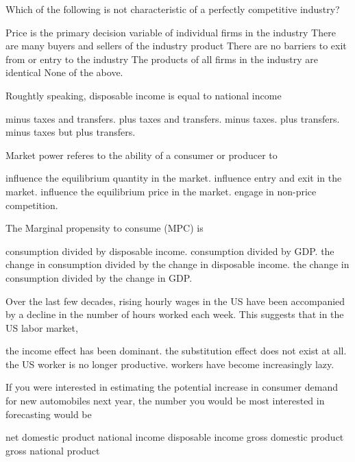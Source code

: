 \begin{questions}
  \question[2] Which of the following is not characteristic of a
  perfectly competitive industry?
  \begin{choices}
    \CorrectChoice Price is the primary decision variable of
    individual firms in the industry
    \choice There are many buyers and sellers of the industry product
    \choice There are no barriers to exit from or entry to the
    industry
    \choice The products of all firms in the industry are identical
    \choice None of the above.
  \end{choices}

  \question[2] Roughtly speaking, disposable income is equal to
  national income
  \begin{choices}
    \choice minus taxes and transfers.
    \choice plus taxes and transfers.
    \choice minus taxes.
    \choice plus transfers.
    \CorrectChoice minus taxes but plus transfers.
  \end{choices}

  \question[2] Market power referes to the ability of a consumer or
  producer to
  \begin{choices}
    \choice influence the equilibrium quantity in the market.
    \choice influence entry and exit in the market.
    \CorrectChoice influence the equilibrium price in the market.
    \choice engage in non-price competition.
  \end{choices}

  \question[2] The Marginal propensity to consume (MPC) is
  \begin{choices}
    \choice consumption divided by disposable income.
    \choice consumption divided by GDP.
    \CorrectChoice the change in consumption divided by the change in
    disposable income.
    \choice the change in consumption divided by the change in GDP.
  \end{choices}

  \question[2] Over the last few decades, rising hourly wages in the
  US have been accompanied by a decline in the number of hours worked
  each week. This suggests that in the US labor market,
  \begin{choices}
    \CorrectChoice the income effect has been dominant.
    \choice the substitution effect does not exist at all.
    \choice the US worker is no longer productive.
    \choice workers have become increasingly lazy.
  \end{choices}

  \question[2] If you were interested in estimating the potential
  increase in consumer demand for new automobiles next year, the
  number you would be most interested in forecasting would be
  \begin{choices}
    \choice net domestic product
    \choice national income
    \CorrectChoice disposable income
    \choice gross domestic product
    \choice gross national product
  \end{choices}


\end{questions}
